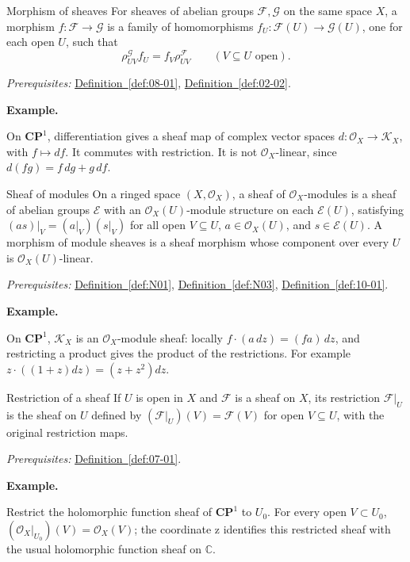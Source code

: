 \documentclass[11pt]{article}
\makeatletter
\newcommand{\C}{\mathbb C}
\newcounter{definition}
\newcommand{\CP}{\mathbf{CP}}
\newcommand{\exampleheading}{\par\medskip\textbf{Example.}\par\smallskip}
\newcommand{\currentdefinition}[1]{\protected@edef\@currentlabel{#1}}
\makeatother
\begin{document}
\begin{definitionbox}{Morphism of sheaves}
\currentdefinition{\thedefinition}
\label{def:10-01}
For sheaves of abelian groups $\mathcal F,\mathcal G$ on the same space $X$, a morphism $f:\mathcal F\to\mathcal G$ is a family of homomorphisms $f_U:\mathcal F(U)\to\mathcal G(U)$, one for each open $U$, such that
\[\rho^{\mathcal G}_{UV}f_U=f_V\rho^{\mathcal F}_{UV}\qquad(V\subseteq U\text{ open}).\]

\smallskip
\textit{Prerequisites:} \hyperref[def:08-01]{Definition~\ref*{def:08-01}}, \hyperref[def:02-02]{Definition~\ref*{def:02-02}}.

\exampleheading
On $\CP^1$, differentiation gives a sheaf map of complex vector spaces $d:\mathcal O_X\to\mathcal K_X$, with $f\mapsto df$. It commutes with restriction. It is not $\mathcal O_X$-linear, since $d(fg)=f\,dg+g\,df$.
\end{definitionbox}

\begin{definitionbox}{Sheaf of modules}
\currentdefinition{\thedefinition}
\label{def:N05}
On a ringed space $(X,\mathcal O_X)$, a sheaf of $\mathcal O_X$-modules is a sheaf of abelian groups $\mathcal E$ with an $\mathcal O_X(U)$-module structure on each $\mathcal E(U)$, satisfying $(as)|_V=(a|_V)(s|_V)$ for all open $V\subseteq U$, $a\in\mathcal O_X(U)$, and $s\in\mathcal E(U)$. A morphism of module sheaves is a sheaf morphism whose component over every $U$ is $\mathcal O_X(U)$-linear.

\smallskip
\textit{Prerequisites:} \hyperref[def:N01]{Definition~\ref*{def:N01}}, \hyperref[def:N03]{Definition~\ref*{def:N03}}, \hyperref[def:10-01]{Definition~\ref*{def:10-01}}.

\exampleheading
On $\CP^1$, $\mathcal K_X$ is an $\mathcal O_X$-module sheaf: locally $f\cdot(a\,dz)=(fa)\,dz$, and restricting a product gives the product of the restrictions. For example $z\cdot((1+z)dz)=(z+z^2)dz$.
\end{definitionbox}

\begin{definitionbox}{Restriction of a sheaf}
\currentdefinition{\thedefinition}
\label{def:07-04}
If $U$ is open in $X$ and $\mathcal F$ is a sheaf on $X$, its restriction $\mathcal F|_U$ is the sheaf on $U$ defined by $(\mathcal F|_U)(V)=\mathcal F(V)$ for open $V\subseteq U$, with the original restriction maps.

\smallskip
\textit{Prerequisites:} \hyperref[def:07-01]{Definition~\ref*{def:07-01}}.

\exampleheading
Restrict the holomorphic function sheaf of $\CP^1$ to $U_0$. For every open $V\subset U_0$, $(\mathcal O_X|_{U_0})(V)=\mathcal O_X(V)$; the coordinate z identifies this restricted sheaf with the usual holomorphic function sheaf on $\C$.
\end{definitionbox}
\end{document}
